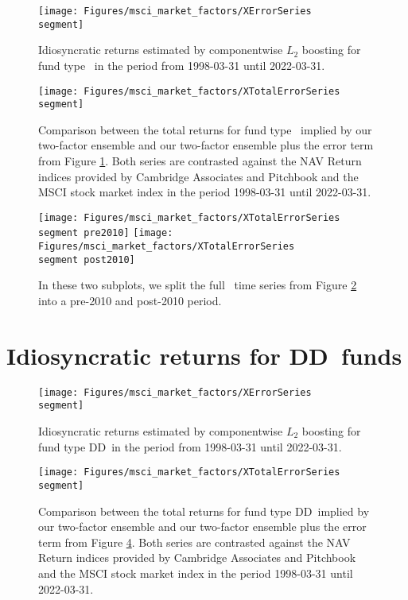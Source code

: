 \begin{figure}[H]
	\centering
	\texttt{[image: Figures/msci\_market\_factors/XErrorSeries\\segment]}
	\caption{Idiosyncratic returns estimated by componentwise $L_2$ boosting for fund type \segment \ in the period from 1998-03-31 until 2022-03-31.}
	\label{fig:clb_idio_\segment}
\end{figure}

\begin{figure}[H]
	\centering
	\texttt{[image: Figures/msci\_market\_factors/XTotalErrorSeries\\segment]}
	\caption{
		Comparison between the total returns for fund type \segment \ implied by our two-factor ensemble and our two-factor ensemble plus the error term from Figure \ref{fig:clb_idio_\segment}.
		Both series are contrasted against the NAV Return indices provided by Cambridge Associates and Pitchbook and the MSCI stock market index in the period 1998-03-31 until 2022-03-31.
	}
	\label{fig:clb_total_\segment}
\end{figure}

\begin{figure}[H]
	\centering
	\texttt{[image: Figures/msci\_market\_factors/XTotalErrorSeries\\segment pre2010]}
	\texttt{[image: Figures/msci\_market\_factors/XTotalErrorSeries\\segment post2010]}
	\caption{
		In these two subplots, we split the full \segment \ time series from Figure \ref{fig:clb_total_\segment} into a pre-2010 and post-2010 period.
	}
	\label{fig:clb_pre_post_2010_\segment}
\end{figure}


\renewcommand{\segment}{DD}

\section{Idiosyncratic returns for \segment \ funds}
\label{sec:errors_\segment}

\begin{figure}[H]
	\centering
	\texttt{[image: Figures/msci\_market\_factors/XErrorSeries\\segment]}
	\caption{Idiosyncratic returns estimated by componentwise $L_2$ boosting for fund type \segment \ in the period from 1998-03-31 until 2022-03-31.}
	\label{fig:clb_idio_\segment}
\end{figure}

\begin{figure}[H]
	\centering
	\texttt{[image: Figures/msci\_market\_factors/XTotalErrorSeries\\segment]}
	\caption{
		Comparison between the total returns for fund type \segment \ implied by our two-factor ensemble and our two-factor ensemble plus the error term from Figure \ref{fig:clb_idio_\segment}.
		Both series are contrasted against the NAV Return indices provided by Cambridge Associates and Pitchbook and the MSCI stock market index in the period 1998-03-31 until 2022-03-31.
	}
	\label{fig:clb_total_\segment}
\end{figure}

